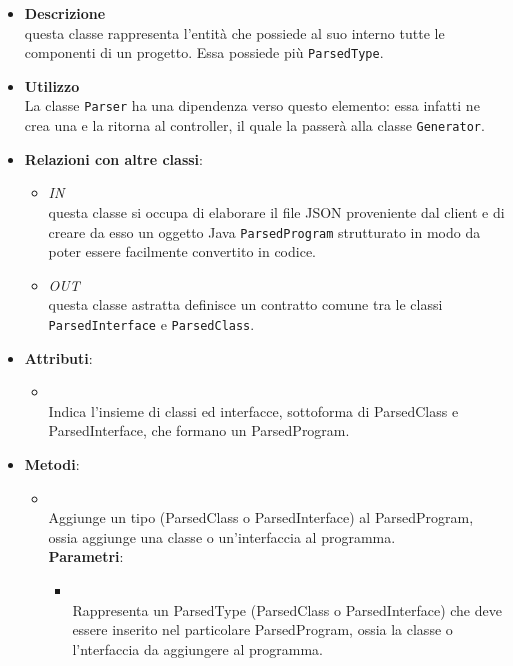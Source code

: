 \begin{itemize}
\item \textbf{Descrizione}\\
questa classe rappresenta l'entità che possiede al suo interno tutte le componenti di un progetto. Essa possiede più \texttt{ParsedType}.
\item \textbf{Utilizzo}\\
La classe \texttt{Parser} ha una dipendenza verso questo elemento: essa infatti ne crea una e la ritorna al controller, il quale la passerà alla classe \texttt{Generator}.
\item \textbf{Relazioni con altre classi}:
\begin{itemize}
\item \textit{IN} \hyperref[\nogloxy{swedesigner::server::parser::Parser}]{}\\
questa classe si occupa di elaborare il file JSON proveniente dal client e di creare da esso un oggetto Java \texttt{ParsedProgram} strutturato in modo da poter essere facilmente convertito in codice.
\item \textit{OUT} \hyperref[\nogloxy{swedesigner::server::project::ParsedType}]{}\\
questa classe astratta definisce un contratto comune tra le classi \texttt{ParsedInterface} e \texttt{ParsedClass}. 
\end{itemize}
\item \textbf{Attributi}:
\begin{itemize}
\item {}
\\ Indica l'insieme di classi ed interfacce, sottoforma di ParsedClass e ParsedInterface, che formano un ParsedProgram.
\end{itemize}
\item \textbf{Metodi}:
\begin{itemize}
\item {}
\\ Aggiunge un tipo (ParsedClass o ParsedInterface) al ParsedProgram, ossia aggiunge una classe o un'interfaccia al programma.
\\ \textbf{Parametri}:
\begin{itemize}
\item {}
\\ Rappresenta un ParsedType (ParsedClass o ParsedInterface) che deve essere inserito nel particolare ParsedProgram, ossia la classe o l'nterfaccia da aggiungere al programma.

\end{itemize}
\end{itemize}
\end{itemize}
